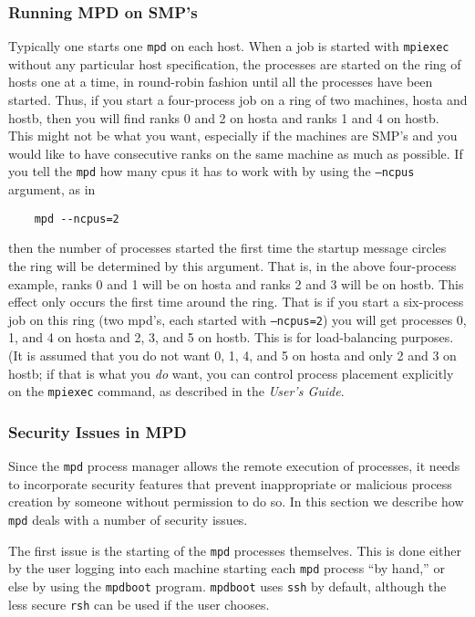 \documentclass[dvipdfm,11pt]{article}
\begin{document}
\subsubsection{Running MPD on SMP's}
\label{sec:mpd-on-smps}

Typically one starts one \texttt{mpd} on each host.  When a job is
started with \texttt{mpiexec} without any particular host specification,
the processes are started on the ring of hosts one at a time, in
round-robin fashion until all the processes have been started.  Thus, if
you start a four-process job on a ring of two machines, hosta and hostb,
then you will find ranks 0 and 2 on hosta and ranks 1 and 4  on hostb.
This might not be what you want, especially if the machines are SMP's
and you would like to have consecutive ranks on the same machine as much
as possible.  If you tell the \texttt{mpd} how many cpus it has to work
with by using the \texttt{--ncpus} argument, as in 
\begin{verbatim}
    mpd --ncpus=2
\end{verbatim}
then the number of processes started the first time the startup message
circles the ring will be determined by this argument.  That is, in the
above four-process example, ranks 0 and 1 will be on hosta and ranks 2
and 3 will be on hostb.  This effect only occurs the first time around
the ring.  That is if you start a six-process job on this ring (two
mpd's, each started with \texttt{--ncpus=2}) you will get processes 0,
1, and 4 on hosta and 2, 3, and 5 on hostb.  This is for load-balancing
purposes.  (It is assumed that you do not want 0, 1, 4, and 5 on hosta
and only 2 and 3 on hostb; if that is what you \emph{do} want, you can
control process placement explicitly on the \texttt{mpiexec} command, as
described in the \textit{User's Guide}.


\subsubsection{Security Issues in MPD}
\label{sec:mpd-security}

Since the \texttt{mpd} process manager allows the remote execution of
processes, it needs to incorporate security features that prevent
inappropriate or malicious process creation by someone without
permission to do so.  In this section we describe how \texttt{mpd} deals
with a number of security issues.

The first issue is the starting of the \texttt{mpd} processes
themselves.  This is done either by the user logging into each machine
starting each \texttt{mpd} process ``by hand,'' or else by using the
\texttt{mpdboot} program.  \texttt{mpdboot} uses \texttt{ssh} by
default, although the less secure \texttt{rsh} can be used if the user
chooses.
\end{document}
